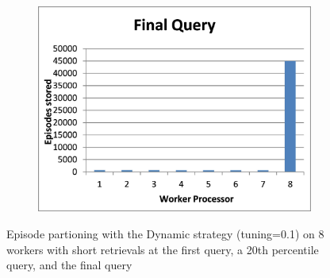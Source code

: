 \documentclass[11pt]{article} %
\begin{document}
\begin{figure}
\begin{subfigure}[b]{0.33\textwidth}
        \end{subfigure}%
        \begin{subfigure}[b]{0.33\textwidth}
                \centering
                \includegraphics[width=\textwidth]{images/shortfinalquery}
                \label{fig:shortdynam3}
        \end{subfigure}
        \caption{Episode partioning with the Dynamic strategy (tuning=0.1) on 8 workers with short retrievals at the first query, a 20th percentile query, and the final query}\label{fig:shortdynam}
\end{figure}
\end{document}
